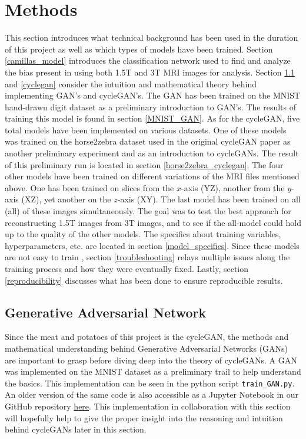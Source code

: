\documentclass[12pt, fleqn, titlepage]{article}
\newcommand{\1}[1]{\mathds{1}\left[#1\right]}
\begin{document}
\section{Methods}
This section introduces what technical background has been used in the duration of this project as well as which types of models have been trained. Section \ref{camillas_model} introduces the classification network used to find and analyze the bias present in using both 1.5T and 3T MRI images for analysis. Section \ref{gan} and \ref{cyclegan} consider the intuition and mathematical theory behind implementing GAN's and cycleGAN's. The GAN has been trained on the MNIST hand-drawn digit dataset as a preliminary introduction to GAN's. The results of training this model is found in section \ref{MNIST_GAN}. As for the cycleGAN, five total models have been implemented on various datasets. One of these models was trained on the horse2zebra dataset used in the original cycleGAN paper \cite{original_cyclegan} as another preliminary experiment and as an introduction to cycleGANs. The result of this preliminary run is located in section \ref{horse2zebra_cyclegan}. The four other models have been trained on different variations of the MRI files mentioned above. One has been trained on slices from the $x$-axis (YZ), another from the $y$-axis (XZ), yet another on the $z$-axis (XY). The last model has been trained on all (all) of these images simultaneously. The goal was to test the best approach for reconstructing 1.5T images from 3T images, and to see if the all-model could hold up to the quality of the other models. The specifics about training variables, hyperparameters, etc. are located in section \ref{model_specifics}. Since these models are not easy to train \cite{hard_to_train}, section \ref{troubleshooting} relays multiple issues along the training process and how they were eventually fixed. Lastly, section \ref{reproducibility} discusses what has been done to ensure reproducible results.



\subsection{Generative Adversarial Network}\label{gan}
Since the meat and potatoes of this project is the cycleGAN, the methods and mathematical understanding behind Generative Adversarial Networks (GANs) are important to grasp before diving deep into the theory of cycleGANs. A GAN was implemented on the MNIST dataset as a preliminary trail to help understand the basics. This implementation can be seen in the python script \texttt{train\_GAN.py}. An older version of the same code is also accessible as a Jupyter Notebook in our GitHub repository  \href{https://github.com/oskarwiese/AlzPred/blob/main/preliminary/GAN_MNIST.ipynb}{here}. This implementation in collaboration with this section will hopefully help to give the proper insight into the reasoning and intuition behind cycleGANs later in this section.
\end{document}
